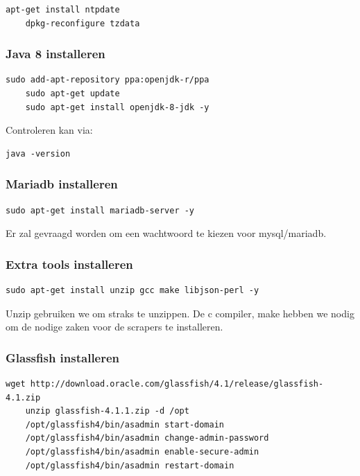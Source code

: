 \begin{lstlisting}[style=BashInputStyle]
	apt-get install ntpdate
	dpkg-reconfigure tzdata
\end{lstlisting}





\subsubsection{Java 8 installeren}

\begin{lstlisting}[style=BashInputStyle]
	sudo add-apt-repository ppa:openjdk-r/ppa
	sudo apt-get update 
	sudo apt-get install openjdk-8-jdk -y
\end{lstlisting}

Controleren kan via:

\begin{lstlisting}[style=BashInputStyle]
	java -version
\end{lstlisting}

\subsubsection{Mariadb installeren}

\begin{lstlisting}[style=BashInputStyle]
	sudo apt-get install mariadb-server -y
\end{lstlisting}

Er zal gevraagd worden om een wachtwoord te kiezen voor mysql/mariadb.

\subsubsection{Extra tools installeren}

\begin{lstlisting}[style=BashInputStyle]
	sudo apt-get install unzip gcc make libjson-perl -y
\end{lstlisting}

Unzip gebruiken we om straks te unzippen. De c compiler, make hebben we nodig om de nodige zaken voor de scrapers te installeren.

\subsubsection{Glassfish installeren}

\begin{lstlisting}[style=BashInputStyle]
	wget http://download.oracle.com/glassfish/4.1/release/glassfish-4.1.zip
	unzip glassfish-4.1.1.zip -d /opt
	/opt/glassfish4/bin/asadmin start-domain
	/opt/glassfish4/bin/asadmin change-admin-password
	/opt/glassfish4/bin/asadmin enable-secure-admin
	/opt/glassfish4/bin/asadmin restart-domain
\end{lstlisting}

